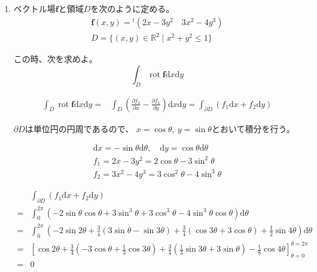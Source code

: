 \documentclass[12pt,b5paper]{ltjsarticle}
\newcommand{\Rot}{\mathop{\mathrm{rot}}\nolimits}
\begin{document}
\begin{enumerate}
 \item
      ベクトル場$\bm{f}$と領域$D$を次のように定める。
      \begin{gather}
       \bm{f}(x,y) = {}^{t}(2x-3y^2 \quad 3x^2-4y^3)\\
       D = \{ (x,y)\in\mathbb{R}^2 \mid x^2+y^2\leq 1 \}
      \end{gather}

      この時、次を求めよ。
      \begin{equation}
       \int_D \Rot\bm{f} \mathrm{d}x\mathrm{d}y
      \end{equation}

\dotfill

      \begin{align}
       \int_D \Rot\bm{f} \mathrm{d}x\mathrm{d}y
       =& \int_D \left(\frac{\partial f_2}{\partial x} - \frac{\partial f_1}{\partial y}\right) \mathrm{d}x\mathrm{d}y
       = \int_{\partial D} ( f_1  \mathrm{d}x + f_2\mathrm{d}y )
      \end{align}

      $\partial D$は単位円の円周であるので、
      $x=\cos \theta,\ y=\sin \theta$とおいて積分を行う。

      \begin{gather}
       \mathrm{d}x = -\sin\theta \mathrm{d}\theta
        , \quad
       \mathrm{d}y = \cos\theta \mathrm{d}\theta\\
       f_1 = 2x-3y^2 = 2\cos\theta-3\sin^2\theta\\
       f_2 = 3x^2-4y^3 = 3\cos^2\theta -4\sin^3\theta
      \end{gather}

      \begin{align}
       & \int_{\partial D} ( f_1  \mathrm{d}x + f_2\mathrm{d}y )\\
       =& \int_{0}^{2\pi} ( -2\sin\theta\cos\theta+3\sin^3\theta + 3\cos^3\theta -4\sin^3\theta\cos\theta)\mathrm{d}\theta\\
       =& \int_{0}^{2\pi} \left( -2\sin2\theta+\frac{3}{4}(3\sin\theta - \sin 3\theta) + \frac{3}{4}(\cos 3\theta + 3\cos\theta) +\frac{1}{2}\sin4\theta \right)\mathrm{d}\theta\\
       =& \left[
         \cos2\theta + \frac{3}{4}\left(-3\cos\theta + \frac{1}{3}\cos 3\theta\right)
         + \frac{3}{4}\left(\frac{1}{3}\sin 3\theta + 3\sin\theta\right) -\frac{1}{8}\cos4\theta
       \right]_{\theta=0}^{\theta=2\pi}\\
       =& 0
      \end{align}
\hrulefill


\end{enumerate}
\end{document}
